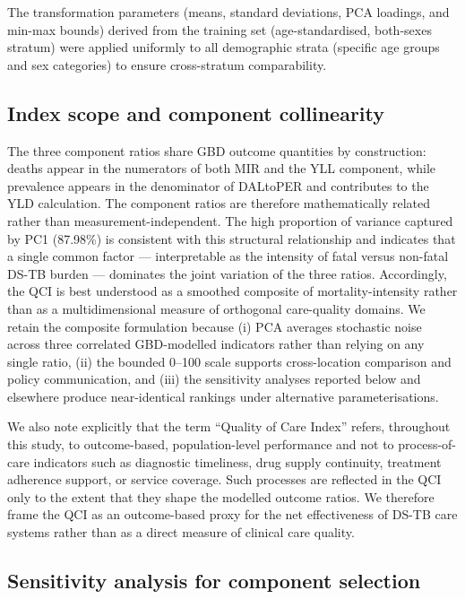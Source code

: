 \documentclass[12pt]{article}
\begin{document}
The transformation parameters (means, standard deviations, PCA loadings, and min-max bounds) derived from the training set (age-standardised, both-sexes stratum) were applied uniformly to all demographic strata (specific age groups and sex categories) to ensure cross-stratum comparability.

\subsection{Index scope and component collinearity}

The three component ratios share GBD outcome quantities by construction: deaths appear in the numerators of both MIR and the YLL component, while prevalence appears in the denominator of DALtoPER and contributes to the YLD calculation. The component ratios are therefore mathematically related rather than measurement-independent. The high proportion of variance captured by PC1 (87.98\%) is consistent with this structural relationship and indicates that a single common factor --- interpretable as the intensity of fatal versus non-fatal DS-TB burden --- dominates the joint variation of the three ratios. Accordingly, the QCI is best understood as a smoothed composite of mortality-intensity rather than as a multidimensional measure of orthogonal care-quality domains. We retain the composite formulation because (i) PCA averages stochastic noise across three correlated GBD-modelled indicators rather than relying on any single ratio, (ii) the bounded 0--100 scale supports cross-location comparison and policy communication, and (iii) the sensitivity analyses reported below and elsewhere produce near-identical rankings under alternative parameterisations.

We also note explicitly that the term ``Quality of Care Index'' refers, throughout this study, to outcome-based, population-level performance and not to process-of-care indicators such as diagnostic timeliness, drug supply continuity, treatment adherence support, or service coverage. Such processes are reflected in the QCI only to the extent that they shape the modelled outcome ratios. We therefore frame the QCI as an outcome-based proxy for the net effectiveness of DS-TB care systems rather than as a direct measure of clinical care quality.

\subsection{Sensitivity analysis for component selection}
\end{document}
